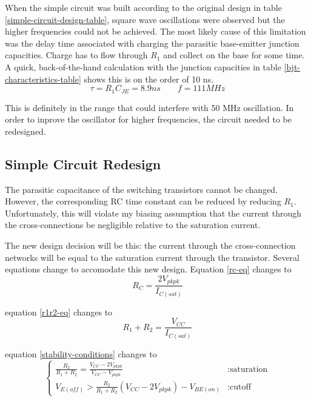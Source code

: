 \documentclass[titlepage, letterpaper, 10.5pt]{article}
\begin{document}
When the simple circuit was built according to the original design in table
\ref{simple-circuit-design-table},
square wave oscillations were observed but the higher frequencies could not be achieved.
The most likely cause of this limitation was the delay time associated with charging the
parasitic base-emitter junction capacities. Charge has to flow through $R_{1}$ and collect
on the base for some time.
A quick, back-of-the-hand calculation with the junction capacities in table \ref{bjt-characteristics-table}
shows this is on the order of 10 ns.
\begin{equation*}
\tau=R_{1}C_{JE}=8.9ns\quad\quad f=111MHz
\end{equation*}

This is definitely in the range that could interfere with 50 MHz oscillation.
In order to inprove the oscillator for higher frequencies, the circuit needed to be redesigned.

\subsection{Simple Circuit Redesign}

The parasitic capacitance of the switching transistors cannot be changed. However,
the corresponding RC time constant can be reduced by reducing $R_{1}$. Unfortunately,
this will violate my biasing assumption that the current through the cross-connections
be negligible relative to the saturation current.

The new design decision will be this: the current through the cross-connection networks
will be equal to the saturation current through the transistor. Several equations change
to accomodate this new design. Equation \ref{rc-eq} changes to
\begin{equation}
R_{C}=\frac{2V_{pkpk}}{I_{C(sat)}}
\label{redesigned-rc-eq}
\end{equation}

equation \ref{r1r2-eq} changes to
\begin{equation}
R_{1}+R_{2}=\frac{V_{CC}}{I_{C(sat)}}
\label{redesigned-r1r2-eq}
\end{equation}

equation \ref{stability-conditions} changes to
\begin{equation}
\left\{
\begin{array}{lr}
\frac{R_{2}}{R_{1}+R_{2}}=\frac{V_{CC}-2V_{pkpk}}{V_{CC}-V_{pkpk}}	& : \textrm{saturation}	\\
V_{E(off)}>\frac{R_{2}}{R_{1}+R_{2}}(V_{CC}-2V_{pkpk})-V_{BE(on)}	& : \textrm{cutoff}
\end{array}
\right.
\label{redesigned-stability-eq}
\end{equation}
\end{document}
